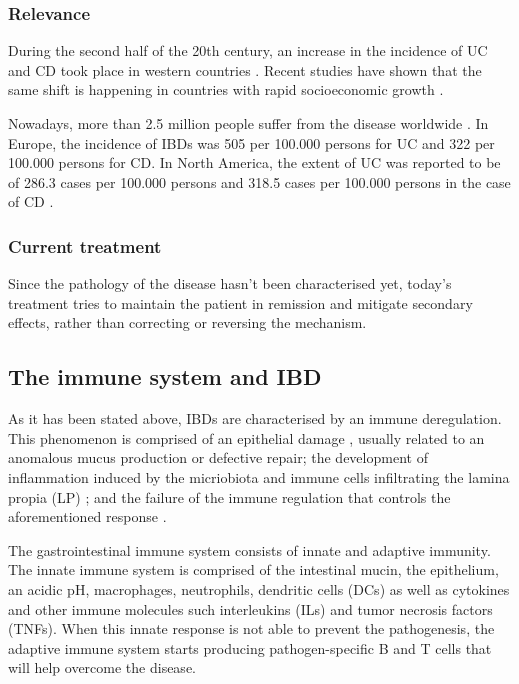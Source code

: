 \documentclass[../main.tex]{subfiles}
\begin{document}
\subsubsection{Relevance}

 During the second half of the 20th century, an increase in the incidence of UC and CD took place in western countries \citep{molodecky_increasing_2012}. Recent studies have shown that the same shift is happening in countries with rapid socioeconomic growth \citep{kaplan_globalisation_2016}.
 
 Nowadays, more than 2.5 million people suffer from the disease worldwide \citep{burisch_burden_2013}. In Europe, the incidence of IBDs was 505 per 100.000 persons for UC and 322 per 100.000 persons for CD. In North America, the extent of UC was reported to be of 286.3 cases per 100.000 persons and 318.5 cases per 100.000 persons in the case of CD \citep{ng_worldwide_2017}.

\subsubsection{Current treatment}
Since the pathology of the disease hasn't been characterised yet, today's treatment tries to maintain the patient in
remission and mitigate secondary effects, rather than correcting or reversing the mechanism. 


\subsection{The immune system and IBD}

As it has been stated above, IBDs are characterised by an immune deregulation. This phenomenon is comprised of an epithelial damage \citep{korzenik_evolving_2006}, usually related to an anomalous mucus production or defective repair; the development of inflammation induced by the micriobiota and immune cells infiltrating the lamina propia (LP) \citep{choy_overview_2017}; and the failure of the immune regulation that controls the aforementioned response \citep{ince_immunologic_2007}. 

The gastrointestinal immune system consists of innate and adaptive immunity. The innate immune system is comprised of the intestinal mucin, the epithelium, an acidic pH, macrophages, neutrophils, dendritic cells (DCs) as well as cytokines and other immune molecules such interleukins (ILs) and tumor necrosis factors (TNFs). When this innate response is not able to prevent the pathogenesis, the adaptive immune system starts producing pathogen-specific B and T cells that will help overcome the disease.
\end{document}

